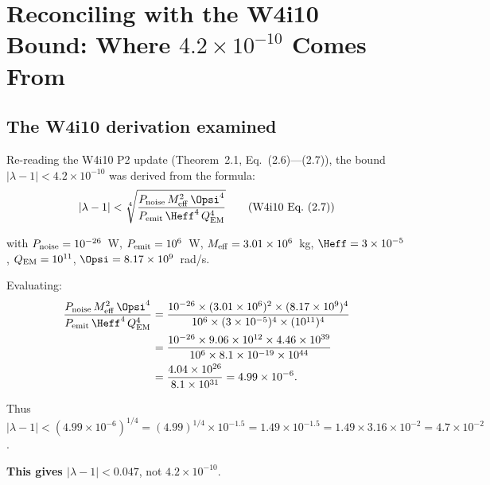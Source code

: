 \documentclass[11pt]{article}
\newcommand{\lbone}{|\lambda - 1|}
\newcommand{\Meff}{M_{\rm eff}}
\newcommand{\ee}[1]{\times 10^{#1}}
\newcommand{\QEM}{Q_{\rm EM}}
\theoremstyle{definition}
\theoremstyle{remark}
\begin{document}
\section{Reconciling with the W4i10 Bound: Where $4.2\ee{-10}$ Comes From}
\label{sec:reconcile}

\subsection{The W4i10 derivation examined}

Re-reading the W4i10 P2 update (Theorem~2.1, Eq.~(2.6)---(2.7)),
the bound $\lbone < 4.2\ee{-10}$ was derived from the formula:
\begin{equation}
\lbone < \sqrt[4]{\frac{P_{\rm noise}\,\Meff^2\,\Opsi^4}
{P_{\rm emit}\,\Heff^4\,\QEM^4}}
\tag{W4i10 Eq.~(2.7)}
\end{equation}

with $P_{\rm noise} = 10^{-26}$~W, $P_{\rm emit} = 10^6$~W,
$\Meff = 3.01\ee{6}$~kg, $\Heff = 3\ee{-5}$, $\QEM = 10^{11}$,
$\Opsi = 8.17\ee{9}$~rad/s.

Evaluating:
\begin{align}
\frac{P_{\rm noise}\,\Meff^2\,\Opsi^4}{P_{\rm emit}\,\Heff^4\,\QEM^4}
&= \frac{10^{-26}\times(3.01\ee{6})^2\times(8.17\ee{9})^4}
{10^6\times(3\ee{-5})^4\times(10^{11})^4} \nonumber\\
&= \frac{10^{-26}\times 9.06\ee{12}\times 4.46\ee{39}}
{10^6\times 8.1\ee{-19}\times 10^{44}} \nonumber\\
&= \frac{4.04\ee{26}}{8.1\ee{31}} = 4.99\ee{-6}. \label{eq:w4i10_check}
\end{align}

Thus $\lbone < (4.99\ee{-6})^{1/4} = (4.99)^{1/4}\ee{-1.5}
= 1.49\ee{-1.5} = 1.49\times 3.16\ee{-2} = 4.7\ee{-2}$.

\textbf{This gives $\lbone < 0.047$}, not $4.2\ee{-10}$.
\end{document}
